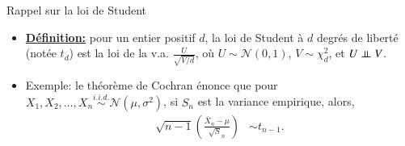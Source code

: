 \begin{frame}
    [allowframebreaks]{Rappel sur la loi de Student}
    \begin{itemize}
        \item \textbf{\underline{Définition:}} pour un entier positif $d$, la loi de Student à $d$ degrés de liberté 
        (notée $t_d$) est la loi de la v.a. $\frac{U}{\sqrt{V/d}}$, où $U\sim\mathcal{N}(0,1)$, $V\sim\chi^2_d$, et $U\perp\!\!\!\perp{V}$.
         \item Exemple: le théorème de Cochran énonce que pour $X_1, X_2, \ldots, X_n \overset{i.i.d.}{\sim}
         \mathcal{N}(\mu, \sigma^2)$, si $S_n$ est la variance empirique, alors,\begin{align*}
         \sqrt{n-1}\left(\frac{\bar{X}_n-\mu}{\sqrt{S}_n}\right)&\sim t_{n-1}.
          \end{align*}
    \end{itemize}
\end{frame}

